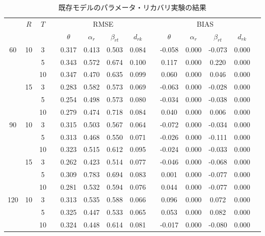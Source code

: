 \documentclass[a4paper,11pt,oneside,openany]{jsbook}
\newcommand{\bhline}[1]{\noalign{\hrule height #1}}
\begin{document}
\begin{table}[tb]
  \begin{center}
  \caption{既存モデルのパラメータ・リカバリ実験の結果}
  \setlength{\tabcolsep}{5.pt}
  \begin{tabular}{cccccccccccccc}  
  \bhline{1pt}
  \multirow{2}{*}{$J$} & \multirow{2}{*}{$R$} & \multirow{2}{*}{$T$}  && \multicolumn{4}{c}{RMSE} &&   \multicolumn{4}{c}{BIAS}  \\
  \cline{5-8}\cline{10-13}
    & & & & $\theta$ & $\alpha_r$ & $\beta_{rt}$ & $d_{rk}$ &  & $\theta$ & $\alpha_r$ & $\beta_{rt}$ & $d_{rk}$ \\
  \bhline{1pt}
  60  & 10 & 3  &  & 0.317 & 0.413 & 0.503 & 0.084 &  & -0.058 & 0.000 & -0.073 & 0.000 \\
    &    & 5  &  & 0.343 & 0.572 & 0.674 & 0.100 &  & 0.117  & 0.000 & 0.220  & 0.000 \\
    &    & 10 &  & 0.347 & 0.470 & 0.635 & 0.099 &  & 0.060  & 0.000 & 0.046  & 0.000 \\
  \cline{2-14}
  & 15 & 3  &  & 0.283 & 0.582 & 0.573 & 0.069 &  & -0.063 & 0.000 & -0.028 & 0.000 \\
  &    & 5  &  & 0.254 & 0.498 & 0.573 & 0.080 &  & -0.034 & 0.000 & -0.038 & 0.000 \\
  &    & 10 &  & 0.279 & 0.474 & 0.718 & 0.084 &  & 0.040  & 0.000 & 0.006  & 0.000 \\
  \hline
  90  & 10 & 3  &  & 0.315 & 0.503 & 0.567 & 0.064 &  & -0.072 & 0.000 & -0.034 & 0.000 \\
  &    & 5  &  & 0.313 & 0.468 & 0.550 & 0.071 &  & -0.026 & 0.000 & -0.111 & 0.000 \\
  &    & 10 &  & 0.323 & 0.515 & 0.612 & 0.095 &  & -0.024 & 0.000 & -0.033 & 0.000 \\
  \cline{2-14}
  & 15 & 3  &  & 0.262 & 0.423 & 0.514 & 0.077 &  & -0.046 & 0.000 & -0.068 & 0.000 \\
  &    & 5  &  & 0.309 & 0.783 & 0.694 & 0.083 &  & 0.001  & 0.000 & -0.077 & 0.000 \\
  &    & 10 &  & 0.281 & 0.532 & 0.594 & 0.076 &  & 0.044  & 0.000 & -0.077 & 0.000 \\
  \hline
  120 & 10 & 3  &  & 0.313 & 0.535 & 0.588 & 0.066 &  & 0.096  & 0.000 & 0.072  & 0.000 \\
  &    & 5  &  & 0.325 & 0.447 & 0.533 & 0.065 &  & 0.053  & 0.000 & 0.082  & 0.000 \\
  &    & 10 &  & 0.324 & 0.448 & 0.614 & 0.081 &  & -0.017 & 0.000 & -0.080 & 0.000 \\

\end{tabular}
\end{center}
\end{table}
\end{document}
